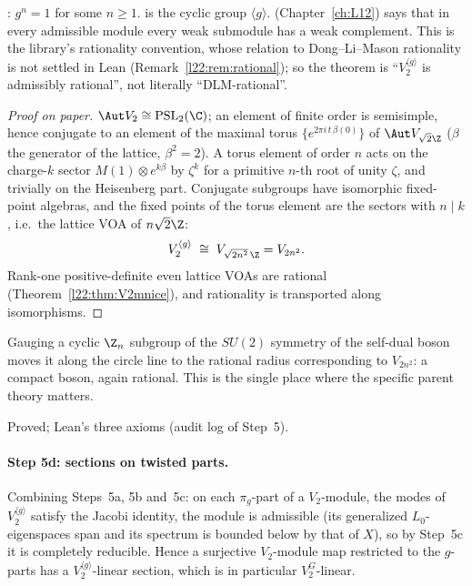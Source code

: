 \begin{dictionary}
: $g^n=1$ for some $n\ge1$.  is the cyclic group $\langle g\rangle$.
 (Chapter~\ref{ch:L12}) says that in every admissible module every weak submodule has a weak
complement. This is the library's rationality convention, whose relation to Dong--Li--Mason rationality is not settled
in Lean (Remark~\ref{l22:rem:rational}); so the theorem is ``$V_2^{\langle g\rangle}$ is admissibly rational'', not
literally ``DLM-rational''.
\end{dictionary}

\begin{proof}[Proof on paper]
$\Aut V_2\cong\mathrm{PSL}_2(\C)$; an element of finite order is semisimple, hence conjugate to an element of the
maximal torus $\{e^{2\pi i\,t\,\beta(0)}\}$ of $\Aut V_{\sqrt2\Z}$ ($\beta$ the generator of the lattice, $\beta^2=2$).
A torus element of order $n$ acts on the charge-$k$ sector $M(1)\otimes e^{k\beta}$ by $\zeta^{k}$ for a primitive
$n$-th root of unity $\zeta$, and trivially on the Heisenberg part. Conjugate subgroups have isomorphic fixed-point algebras, and the fixed points of the torus element are the
sectors with $n\mid k$, i.e.\ the lattice VOA of $n\sqrt2\Z$:
\begin{equation*}
  V_2^{\langle g\rangle}\;\cong\;V_{\sqrt{2n^2}\,\Z}=V_{2n^2}.
\end{equation*}
Rank-one positive-definite even lattice VOAs are rational (Theorem~\ref{l22:thm:V2mnice}), and rationality is
transported along isomorphisms.
\end{proof}

\begin{physics}
Gauging a cyclic $\Z_n$ subgroup of the $SU(2)$ symmetry of the self-dual boson moves it along the circle line to the
rational radius corresponding to $V_{2n^2}$: a compact boson, again rational. This is the single place where the
specific parent theory matters.
\end{physics}

\begin{status}
Proved; Lean's three axioms (audit log of Step~5).
\end{status}

\paragraph{Step 5d: sections on twisted parts.} Combining Steps~5a, 5b and~5c: on each $\pi_g$-part of a $V_2$-module, the modes
of $V_2^{\langle g\rangle}$ satisfy the Jacobi identity, the module is admissible (its generalized $L_0$-eigenspaces span
and its spectrum is bounded below by that of $X$), so by Step~5c it is completely reducible. Hence a surjective $V_2$-module
map restricted to the $g$-parts has a $V_2^{\langle g\rangle}$-linear section, which is in particular $V_2^G$-linear.

